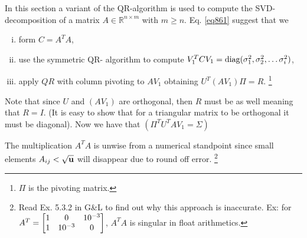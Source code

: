 In this section a variant of the QR-algorithm is used to compute the SVD-decomposition of 
a matrix $A\in\mathbb R^{n\times m}$ with $m\ge n$.
Eq. \eqref{eq861} suggest that we
\begin{enumerate}[(i):]
	\item form $C=A^TA$,
	\item use the symmetric QR- algorithm to compute 
	$V_1^TCV_1 = \text{diag}{(}\sigma_1^2,\sigma_2^2,\dots\sigma_i^2)$,
	\item apply $QR$ with column pivoting to $AV_1$ obtaining $U^T(AV_1)\Pi=R$.
\footnote{$\Pi$ is the pivoting matrix.}
\end{enumerate}
Note that since $U$ and $(AV_1)$ are orthogonal, then $R$ must be as well meaning that $R=I$.
(It is easy to show that for a triangular matrix to be orthogonal it must be diagonal).
Now we have that $(\Pi^TU^T A V_1 = \Sigma)$

The multiplication $A^TA$ is unwise from a numerical standpoint since small elements $A_{ij}<\sqrt{\textbf{u}}$
will disappear due to round off error.
\footnote{
Read Ex. 5.3.2 in G\&L to find out why this approach is inaccurate.
Ex: for $A^T=\left[\begin{matrix} 1 & 0 & 10^{-3} \\ 1 & 10^{-3} & 0 \end{matrix}\right]$, $A^TA$ is singular in float arithmetics.
}




